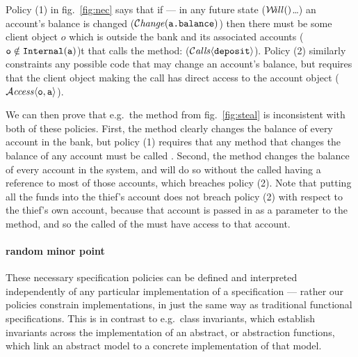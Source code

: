 Policy (1) in fig.~\ref{fig:nec} says that if --- in any future state
($\Future$\ldots) an account's balance is changed
($\mathcal{C}\textrm{\textit{hange}}({\mbox{\tt{a.balance}}})$)
then there must be some client object $o$ which is outside the
bank and its associated accounts (${\mbox{\tt{o}}} \notin{\mbox{\tt{Internal}}}({\mbox{\tt{a}}})$)t
that calls the  method: (${\mathcal{C}}\textrm{\textit{alls}}\langle {\mbox{\tt{deposit}}}\rangle$).
Policy (2) similarly constraints any possible code that may change an
account's balance, but requires that the client object making the call
has direct access to the account object
(${\mathcal{A}}\textrm{\textit{ccess}}\langle {\mbox{\tt{o}}},{\mbox{\tt{a}}}\rangle$).

We can then prove that e.g.\ the  method from
fig.~\ref{fig:steal} is inconsistent with both of these policies.
First, the  method clearly changes the balance of
every account in the bank, but policy (1) requires that any method
that changes the balance of any account must be called .
Second, the  method changes the balance of every account in
the system, and will do so without the called having a reference to
most of those accounts, which breaches policy (2).   Note
that  putting all the funds into the thief's account
does not breach policy (2) with respect to the thief's own account,
because that account is passed in as a parameter to the 
method, and so the called of the  must have access to that
account.


\paragraph{random minor point}

These necessary specification policies
can be defined and interpreted independently of any particular
implementation of a specification --- rather our policies constrain
implementations, in just the same way as traditional functional
specifications.  This is in contrast to e.g.\ class invariants, which
establish invariants across the implementation of an abstract, or
abstraction functions, which link an abstract model to a concrete
implementation of that model. 